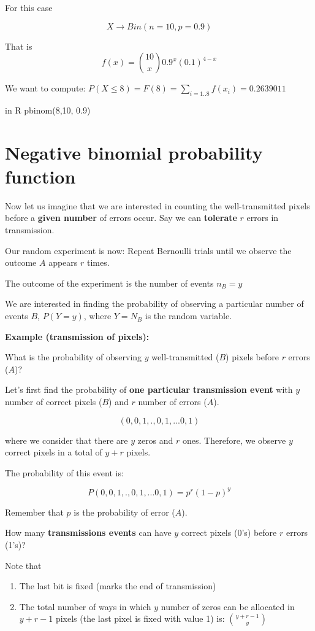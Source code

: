 \documentclass[
]{book}
\begin{document}
For this case

\[X \rightarrow Bin(n=10, p=0.9)\]

That is \[f(x)=\binom {10} x 0.9^x(0.1)^{4-x}\]

We want to compute:
\(P(X\le 8)=F(8)= \sum_{i=1..8} f(x_i)=0.2639011\)

in R pbinom(8,10, 0.9)

\hypertarget{negative-binomial-probability-function}{%
\section{Negative binomial probability function}\label{negative-binomial-probability-function}}

Now let us imagine that we are interested in counting the well-transmitted pixels before a \textbf{given number} of errors occur. Say we can \textbf{tolerate} \(r\) errors in transmission.

Our random experiment is now: Repeat Bernoulli trials until we observe the outcome \(A\) appears \(r\) times.

The outcome of the experiment is the number of events \(n_B=y\)

We are interested in finding the probability of observing a particular number of events \(B\), \(P(Y=y)\), where \(Y=N_B\) is the random variable.

\textbf{Example (transmission of pixels):}

What is the probability of observing \(y\) well-transmitted (\(B\)) pixels before \(r\) errors (\(A\))?

Let's first find the probability of \textbf{one particular} \textbf{transmission event} with \(y\) number of correct pixels (\(B\)) and \(r\) number of errors (\(A\)).

\[(0,0,1,., 0,1,...0,1)\]

where we consider that there are \(y\) zeros and \(r\) ones. Therefore, we observe \(y\) correct pixels in a total of \(y + r\) pixels.

The probability of this event is:

\[P(0,0,1,., 0,1,...0,1)=p^r(1-p)^y\]

Remember that \(p\) is the probability of error (\(A\)).

How many \textbf{transmissions events} can have \(y\) correct pixels (0's) before \(r\) errors (1's)?

Note that

\begin{enumerate}
\def\labelenumi{\arabic{enumi})}
\item
  The last bit is fixed (marks the end of transmission)
\item
  The total number of ways in which \(y\) number of zeros can be allocated in \(y + r-1\) pixels (the last pixel is fixed with value 1) is: \(\binom {y + r-1} y\)
\end{enumerate}
\end{document}
